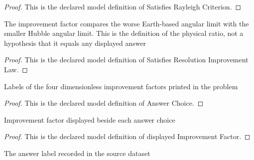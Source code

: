 \begin{proof}
  This is the declared model definition of Satisfies Rayleigh Criterion.
\end{proof}
\begin{definition}
  \label{def:physics:phyx-mini-0131:phyxminiproblems-problemphyxmini0131-satisfiesresolutionimprovementlaw}
  The improvement factor compares the worse Earth-based angular limit with the smaller Hubble angular limit. This is the definition of the physical ratio, not a hypothesis that it equals any displayed answer
\end{definition}
\begin{proof}
  This is the declared model definition of Satisfies Resolution Improvement Law.
\end{proof}
\begin{definition}
  \label{def:physics:phyx-mini-0131:phyxminiproblems-problemphyxmini0131-answerchoice}
  Labels of the four dimensionless improvement factors printed in the problem
\end{definition}
\begin{proof}
  This is the declared model definition of Answer Choice.
\end{proof}
\begin{definition}
  \label{def:physics:phyx-mini-0131:phyxminiproblems-problemphyxmini0131-displayedimprovementfactor}
  Improvement factor displayed beside each answer choice
\end{definition}
\begin{proof}
  This is the declared model definition of displayed Improvement Factor.
\end{proof}
\begin{definition}
  \label{def:physics:phyx-mini-0131:phyxminiproblems-problemphyxmini0131-recordeddatasetanswer}
  The answer label recorded in the source dataset
\end{definition}
